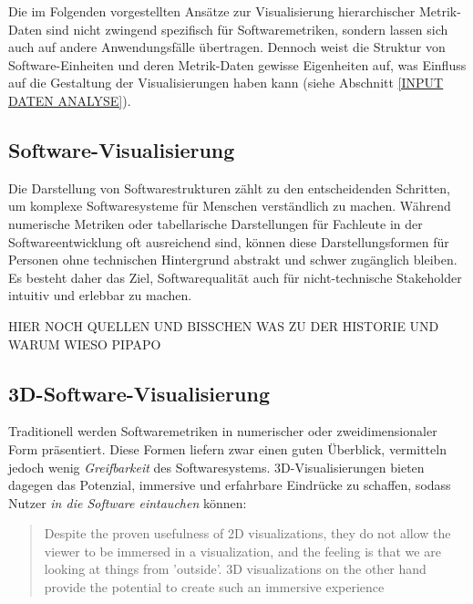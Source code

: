 Die im Folgenden vorgestellten Ansätze zur Visualisierung hierarchischer Metrik-Daten sind nicht zwingend spezifisch für Softwaremetriken, sondern lassen sich auch auf andere Anwendungsfälle übertragen. Dennoch weist die Struktur von Software-Einheiten und deren Metrik-Daten gewisse Eigenheiten auf, was Einfluss auf die Gestaltung der Visualisierungen haben kann (siehe Abschnitt \ref{INPUT DATEN ANALYSE}).



\subsection{Software-Visualisierung} 
\label{sec:SoftwareVisualisierung} 

Die Darstellung von Softwarestrukturen zählt zu den entscheidenden Schritten, um komplexe Softwaresysteme für Menschen verständlich zu machen. Während numerische Metriken oder tabellarische Darstellungen für Fachleute in der Softwareentwicklung oft ausreichend sind, können diese Darstellungsformen für Personen ohne technischen Hintergrund abstrakt und schwer zugänglich bleiben. Es besteht daher das Ziel, Softwarequalität auch für nicht-technische Stakeholder intuitiv und erlebbar zu machen.

HIER NOCH QUELLEN UND BISSCHEN WAS ZU DER HISTORIE UND WARUM WIESO PIPAPO

\subsection{3D-Software-Visualisierung} \label{sec:3DSoftwareVisualisierung}

Traditionell werden Softwaremetriken in numerischer oder zweidimensionaler Form präsentiert. Diese Formen liefern zwar einen guten Überblick, vermitteln jedoch wenig \textit{Greifbarkeit} des Softwaresystems. 3D-Visualisierungen bieten dagegen das Potenzial, immersive und erfahrbare Eindrücke zu schaffen, sodass Nutzer \textit{in die Software eintauchen} können:
\begin{quote}
Despite the proven usefulness of 2D visualizations, they do not allow the viewer to be immersed in a visualization, and the feeling is that we are looking at things from 'outside'. 3D visualizations on the other hand provide the potential to create such an immersive experience \cite[1]{codeCity1}
\end{quote}

